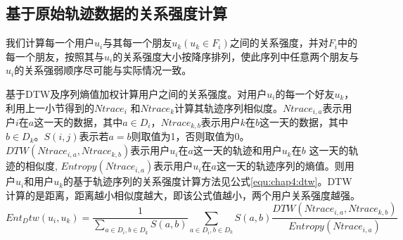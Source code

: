 \subsection{基于原始轨迹数据的关系强度计算}
我们计算每一个用户$u_{i}$与其每一个朋友$u_{k}(u_{k}\in F_{i})$之间的关系强度，并对$F_{i}$中的每一个朋友，按照其与$u_{i}$的关系强度大小按降序排列，使此序列中任意两个朋友与$u_{i}$的关系强弱顺序尽可能与实际情况一致。
\par 基于DTW及序列熵值加权计算用户之间的关系强度。对用户$u_{i}$的每一个好友$u_{k}$，利用上一小节得到的$Ntrace_{i}$ 和$Ntrace_{k}$计算其轨迹序列相似度。$Ntrace_{i,a}$表示用户$i$在$a$这一天的数据，其中$a\in D_{i}$，$Ntrace_{k,b}$表示用户$k$在$b$这一天的数据，其中$b\in D_{k}$。$S(i,j)$表示若$a=b$则取值为1，否则取值为0。$DTW(Ntrace_{i,a},Ntrace_{k,b})$表示用户$u_{i}$在$a$这一天的轨迹和用户$u_{k}$在$b$ 这一天的轨迹的相似度, $Entropy(Ntrace_{i,a})$表示用户$u_{i}$在$a$这一天的轨迹序列的熵值。则用户$u_{i}$和用户$u_{k}$的基于轨迹序列的关系强度计算方法见公式\ref{equ:chap4:dtw}。DTW计算的是距离，距离越小相似度越大，即该公式值越小，两个用户关系强度越强。
\begin{equation}
\label{equ:chap4:dtw}
Ent_Dtw(u_{i},u_{k})=\frac{1}{\sum_{a\in D_{i},b\in D_{k}}S(a,b)}\sum_{a\in D_{i},b\in D_{k}}S(a,b)\frac{DTW(Ntrace_{i,a},Ntrace_{k,b})}{Entropy(Ntrace_{i,a})}
\end{equation}
